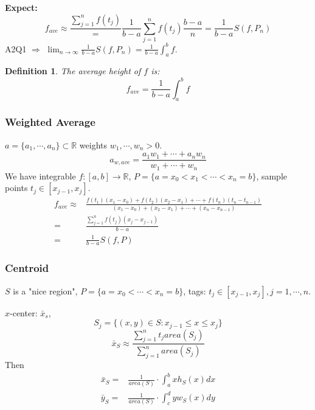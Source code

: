 \documentclass[12pt]{article}
\theoremstyle{plain}
\newtheorem{definition}{Definition}[subsection]
\newcommand{\mR}{{\mathbb{R}}}
\begin{document}
\textbf{Expect: }
\[
	f_{ave} \approx \frac{\sum_{j=1}^n f(t_j)} = \frac1{b-a}\sum_{j=1}^n 
	f(t_j) \frac{b-a}n = \frac1{b-a} S(f,P_n)
\]
A2Q1 $\Rightarrow$ $\lim_{n\to \infty} \frac1{b-a} S(f,P_n)
= \frac1{b-a}\int_a^b f$.\\

\begin{definition}
	The average height of $f$ is: 
	\[
		f_{ave} = \frac1{b-a} \int_a^b f
	\]
\end{definition}


\subsubsection{Weighted Average}
$a = \{a_1, \cdots, a_n\} \subset \mR$ weights $w_1, \cdots, w_n > 0$. 
\[
	a_{w, ave} = \frac{a_1w_1 + \cdots +a_nw_n}{w_1 + \cdots +w_n}
\]
We have integrable $f:[a,b] \to \mR$, $P=\{a = x_0 < x_1 < \cdots < x_n=b\}$,
sample points $t_j \in [x_{j-1}, x_j]$. 
\begin{align*}
	f_{ave} 
	\approx& \frac{f(t_1)(x_1-x_{0}) + f(t_2)(x_2-x_1) + 
	\cdots + f(t_n)(t_n-t_{n-1})}{(x_1-x_0)+(x_2-x_1)+\cdots+(x_n-x_{n-1})}\\
	=& \frac{\sum_{j=1}^n f(t_j) (x_j-x_{j-1})}{b-a}\\ 
	=& \frac1{b-a} S(f,P)
\end{align*}

\subsubsection{Centroid}
$S$ is a "nice region", $P=\{a = x_0 < \cdots < x_n = b\}$, tags: 
$t_j \in [x_{j-1}, x_j], j = 1, \cdots, n$. 

$x$-center: $\bar x_s$, 
\[
	S_j = \{(x,y) \in S : x_{j-1} \leq x \leq x_j\}
\]
\[
	\bar x_S \approx \frac{\sum_{j=1}^n t_j area(S_j) }{\sum_{j=1}^n area(S_j)}
\]
Then 
\begin{align*}
	\bar x_S =& \frac 1{area(S)} \cdot \int_a^b xh_S(x) dx\\
	\bar y_S =& \frac 1{area(S)} \cdot \int_c^d yw_S(x) dy\\
\end{align*}
\newpage
\end{document}
